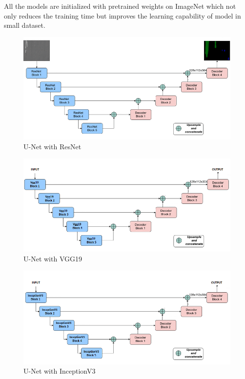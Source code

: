 \documentclass[rnd]{mas_proposal}
\begin{document}
All the models are initialized with pretrained weights on ImageNet which not only reduces the training time but improves the learning capability of model in small dataset. 


\begin{figure}[htp] 
        \centering
        \includegraphics[width=1.2\textwidth]{images/fig4.png}
        \caption{U-Net with ResNet}%
        \label{fig:U-Net with ResNet}%
\end{figure}

\begin{figure}[htp] 
        \centering
        \includegraphics[width=1.2\textwidth]{images/fig7.png}
        \caption{U-Net with VGG19}%
        \label{fig:U-Net with VGG19}%
\end{figure}

\begin{figure}[htp] 
        \centering
        \includegraphics[width=1.2\textwidth]{images/fig8.png}
        \caption{U-Net with InceptionV3}%
        \label{fig:U-Net with InceptionV3}%
\end{figure}
\end{document}
